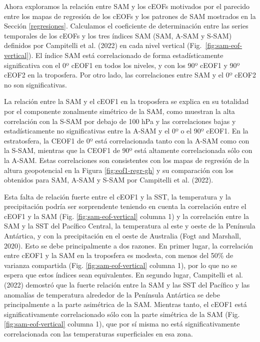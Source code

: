 \documentclass[12pt,oneside]{reedthesis}
\begin{document}
Ahora exploramos la relación entre SAM y los cEOFs motivados por el parecido entre los mapas de regresión de los cEOFs y los patrones de SAM mostrados en la Sección \ref{regresiones}.
Calculamos el coeficiente de determinación entre las series temporales de los cEOFs y los tres índices SAM (SAM, A-SAM y S-SAM) definidos por Campitelli et al. (2022) en cada nivel vertical (Fig.~\ref{fig:sam-eof-vertical}).
El índice SAM está correlacionado de forma estadísticamente significativa con el 0º cEOF1 en todos los niveles, y con los 90º cEOF1 y 90º cEOF2 en la troposfera.
Por otro lado, las correlaciones entre SAM y el 0º cEOF2 no son significativas.

La relación entre la SAM y el cEOF1 en la troposfera se explica en su totalidad por el componente zonalmente simétrico de la SAM, como muestran la alta correlación con la S-SAM por debajo de 100 hPa y las correlaciones bajas y estadísticamente no significativas entre la A-SAM y el 0º o el 90º cEOF1.
En la estratosfera, la CEOF1 de 0º está correlacionada tanto con la A-SAM como con la S-SAM, mientras que la CEOF1 de 90º está altamente correlacionada sólo con la A-SAM.
Estas correlaciones son consistentes con los mapas de regresión de la altura geopotencial en la Figura \ref{fig:eof1-regr-gh} y su comparación con los obtenidos para SAM, A-SAM y S-SAM por Campitelli et al. (2022).

Esta falta de relación fuerte entre el cEOF1 y la SST, la temperatura y la precipitación podría ser sorprendente teniendo en cuenta la correlación entre el cEOF1 y la SAM (Fig. \ref{fig:sam-eof-vertical} columna 1) y la correlación entre la SAM y la SST del Pacífico Central, la temperatura al este y oeste de la Península Antártica, y con la precipitación en el oeste de Australia (Fogt and Marshall, 2020).
Esto se debe principalmente a dos razones.
En primer lugar, la correlación entre cEOF1 y la SAM en la troposfera es modesta, con menos del 50\% de varianza compartida (Fig. \ref{fig:sam-eof-vertical} columna 1), por lo que no se espera que estos índices sean equivalentes.
En segundo lugar, Campitelli et al. (2022) demostró que la fuerte relación entre la SAM y las SST del Pacífico y las anomalías de temperatura alrededor de la Península Antártica se debe principalmente a la parte asimétrica de la SAM.
Mientras tanto, el cEOF1 está significativamente correlacionado sólo con la parte simétrica de la SAM (Fig. \ref{fig:sam-eof-vertical} columna 1), que por sí misma no está significativamente correlacionada con las temperaturas superficiales en esa zona.
\end{document}
